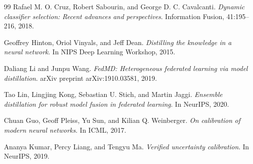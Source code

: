 \documentclass[12pt]{article}
\begin{document}
\begin{thebibliography}{99}
Rafael M. O. Cruz, Robert Sabourin, and George D. C. Cavalcanti.
\textit{Dynamic classifier selection: Recent advances and perspectives}.
Information Fusion, 41:195--216, 2018.

Geoffrey Hinton, Oriol Vinyals, and Jeff Dean.
\textit{Distilling the knowledge in a neural network}.
In NIPS Deep Learning Workshop, 2015.

Daliang Li and Junpu Wang.
\textit{FedMD: Heterogeneous federated learning via model distillation}.
arXiv preprint arXiv:1910.03581, 2019.

Tao Lin, Lingjing Kong, Sebastian U. Stich, and Martin Jaggi.
\textit{Ensemble distillation for robust model fusion in federated learning}.
In NeurIPS, 2020.

Chuan Guo, Geoff Pleiss, Yu Sun, and Kilian Q. Weinberger.
\textit{On calibration of modern neural networks}.
In ICML, 2017.

Ananya Kumar, Percy Liang, and Tengyu Ma.
\textit{Verified uncertainty calibration}.
In NeurIPS, 2019.

\end{thebibliography}
\end{document}

